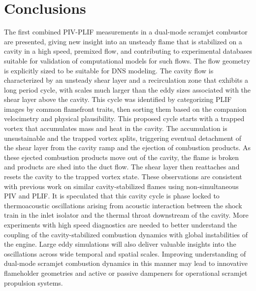 \section*{Conclusions}
The first combined PIV-PLIF measurements in a dual-mode scramjet combustor are presented, giving new insight into an unsteady flame that is stabilized on a cavity in a high speed, premixed flow, and contributing to experimental databases suitable for validation of computational models for such flows.  The flow geometry is explicitly sized to be suitable for DNS modeling. The cavity flow is characterized by an unsteady shear layer and a recirculation zone that exhibits a long period cycle, with scales much larger than the eddy sizes associated with the shear layer above the cavity. This cycle was identified by categorizing PLIF images by common flamefront traits, then sorting them based on the companion velocimetry and physical plausibility. This proposed cycle starts with a trapped vortex that accumulates mass and heat in the cavity. The accumulation is unsustainable and the trapped vortex splits, triggering eventual detachment of the shear layer from the cavity ramp and the ejection of combustion products. As these ejected combustion products move out of the cavity, the flame is broken and products are shed into the duct flow. The shear layer then reattaches and resets the cavity to the trapped vortex state. These observations are consistent with previous work on similar cavity-stabilized flames using non-simultaneous PIV and PLIF. It is speculated that this cavity cycle is phase locked to thermoacoustic oscillations arising from acoustic interaction between the shock train in the inlet isolator and the thermal throat downstream of the cavity.  More experiments with high speed diagnostics are needed to better understand the coupling of the cavity-stabilized combustion dynamics with global instabilities of the engine. Large eddy simulations will also deliver valuable insights into the oscillations across wide temporal and spatial scales. Improving understanding of dual-mode scramjet combustion dynamics in this manner may lead to innovative flameholder geometries and active or passive dampeners for operational scramjet propulsion systems.
